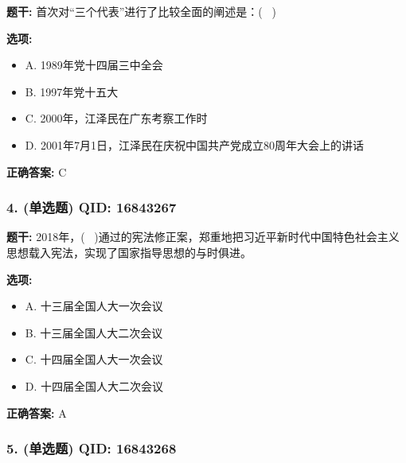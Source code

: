 \documentclass[12pt,UTF8]{ctexart}
\begin{document}
\textbf{题干:}
首次对“三个代表”进行了比较全面的阐述是：(  )

\textbf{选项:}
\begin{itemize}[leftmargin=*]

  \item A. 1989年党十四届三中全会

  \item B. 1997年党十五大

  \item C. 2000年，江泽民在广东考察工作时

  \item D. 2001年7月1日，江泽民在庆祝中国共产党成立80周年大会上的讲话

\end{itemize}

\textbf{正确答案:}
C

\vspace{0.3em}\hrulefill\vspace{0.7em}

\subsubsection*{4. (单选题) \small QID: 16843267}

\textbf{题干:}
2018年，(  )通过的宪法修正案，郑重地把习近平新时代中国特色社会主义思想载入宪法，实现了国家指导思想的与时俱进。

\textbf{选项:}
\begin{itemize}[leftmargin=*]

  \item A. 十三届全国人大一次会议

  \item B. 十三届全国人大二次会议

  \item C. 十四届全国人大一次会议

  \item D. 十四届全国人大二次会议

\end{itemize}

\textbf{正确答案:}
A

\vspace{0.3em}\hrulefill\vspace{0.7em}

\subsubsection*{5. (单选题) \small QID: 16843268}
\end{document}
